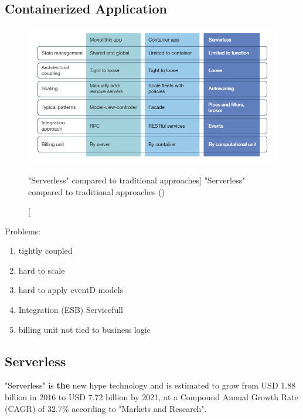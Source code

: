 \subsection{Containerized Application}

\begin{figure}[ht]
    \includegraphics[width=\linewidth]{images/serverless/demyst.png}\centering
    \caption
    ["Serverless" compared to traditional approaches]
    {"Serverless" compared to traditional approaches (\cite{Hammond2018DemystifyingComputing})}
    \label{fig:slessCompared}
\end{figure}

Problems:
\begin{enumerate}
    \item tightly coupled
    \item hard to scale
    \item hard to apply eventD models
    \item Integration (ESB)  Servicefull
    \item billing unit not tied to business logic
\end{enumerate}


\subsection{Serverless}

"Serverless" is \textbf{the} new hype technology and is estimated to grow from USD 1.88 billion in 2016 to USD 7.72 billion by 2021, at a Compound Annual Growth Rate (CAGR) of 32.7\% according to "Markets and Research".\autocite{2017Function-as-a-Service2021} 

